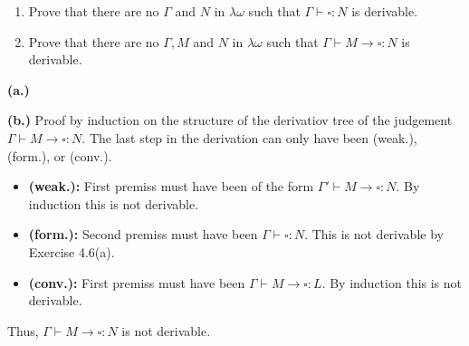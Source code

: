 \begin{problem}{4.6}
    \begin{enumerate}[label=$(\alph*)$]
    \item Prove that there are no $\Gamma$ and $N$ in $\lambda\omega$ such that $\Gamma \vdash \square : N$ is derivable.
    \item Prove that there are no $\Gamma, M$ and $N$ in $\lambda\omega$ such that $\Gamma \vdash M \rightarrow \square : N$ is derivable.
    \end{enumerate}
\end{problem}

\begin{solution}
    \textbf{(a.)} 

    \textbf{(b.)} Proof by induction on the structure of the derivatiov tree of the judgement $\Gamma \vdash M \to \square : N$.
    The last step in the derivation can only have been (weak.), (form.), or (conv.).
    \begin{itemize}
        \item \textbf{(weak.):} First premiss must have been of the form $\Gamma' \vdash M \to \square : N$. By induction this is not derivable.
        \item \textbf{(form.):} Second premiss must have been $\Gamma \vdash \square : N$. This is not derivable by Exercise 4.6(a).
        \item \textbf{(conv.):} First premiss must have been $\Gamma \vdash M \to \square : L$. By induction this is not derivable.
    \end{itemize}
    Thus, $\Gamma \vdash M \to \square : N$ is not derivable.
\end{solution}